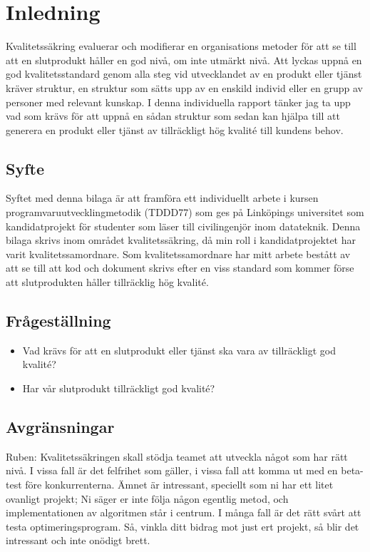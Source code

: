 \section{Inledning}
Kvalitetssäkring evaluerar och modifierar en organisations metoder för att se till att en slutprodukt håller en god nivå, om inte utmärkt nivå.
\newline
\newline
Att lyckas uppnå en god kvalitetsstandard genom alla steg vid utvecklandet av en produkt eller tjänst kräver struktur, en struktur som sätts upp av en enskild individ eller en grupp av personer med relevant kunskap. I denna individuella rapport tänker jag ta upp vad som krävs för att uppnå en sådan struktur som sedan kan hjälpa till att generera en produkt eller tjänst av tillräckligt hög kvalité till kundens behov.

\subsection{Syfte}
Syftet med denna bilaga är att framföra ett individuellt arbete i kursen programvaruutvecklingmetodik (TDDD77) som ges på Linköpings universitet som kandidatprojekt för studenter som läser till civilingenjör inom datateknik. 
\newline
\newline
Denna bilaga skrivs inom området kvalitetssäkring, då min roll i kandidatprojektet har varit kvalitetssamordnare. Som kvalitetssamordnare har mitt arbete bestått av att se till att kod och dokument skrivs efter en viss standard som kommer förse att slutprodukten håller tillräcklig hög kvalité.

\subsection{Frågeställning}

\begin{itemize}
  \item Vad krävs för att en slutprodukt eller tjänst ska vara av tillräckligt god kvalité?
  \item Har vår slutprodukt tillräckligt god kvalité?
\end{itemize}

\subsection{Avgränsningar}

Ruben: Kvalitetssäkringen skall stödja teamet att utveckla något som har rätt nivå. I vissa fall är det
felfrihet som gäller, i vissa fall att komma ut med en beta-test före konkurrenterna. Ämnet är intressant, 
speciellt som ni har ett litet ovanligt projekt; Ni säger er inte följa någon egentlig metod, och 
implementationen av algoritmen står i centrum. I många fall är det rätt svårt att testa optimeringsprogram. Så, vinkla ditt bidrag mot just ert projekt, så blir det intressant och inte onödigt 
brett.
